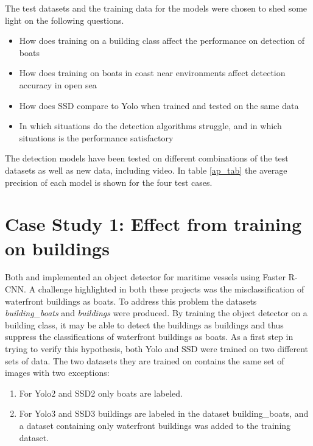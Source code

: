 \vspace{3mm}

The test datasets and the training data for the models were chosen to shed some light on the following questions.

\begin{itemize}
    \item How does training on a building class affect the performance on detection of boats
    \item How does training on boats in coast near environments affect detection accuracy in open sea
    \item How does SSD compare to Yolo when trained and tested on the same data
    \item In which situations do the detection algorithms struggle, and in which situations is the performance satisfactory
\end{itemize}




The detection models have been tested on different combinations of the test datasets as well as new data, including video. In table \ref{ap_tab} the average precision of each model is shown for the four test cases. 







\newpage

\section{Case Study 1: Effect from training on buildings}

Both \citep{Tangstad2017} and \citep{Kamsvag2018} implemented an object detector for maritime vessels using Faster R-CNN. A challenge highlighted in both these projects was the misclassification of waterfront buildings as boats. To address this problem the datasets \textit{building\_boats} and \textit{buildings} were produced. By training the object detector on a building class, it may be able to detect the buildings as buildings and thus suppress the classifications of waterfront buildings as boats. As a first step in trying to verify this hypothesis, both Yolo and SSD were trained on two different sets of data. The two datasets they are trained on contains the same set of images with two exceptions:

\vspace{1mm}

\begin{enumerate}
    \item For Yolo2 and SSD2 only boats are labeled.
    \item For Yolo3 and SSD3 buildings are labeled in the dataset building\_boats, and a dataset containing only waterfront buildings was added to the training dataset.
\end{enumerate}

